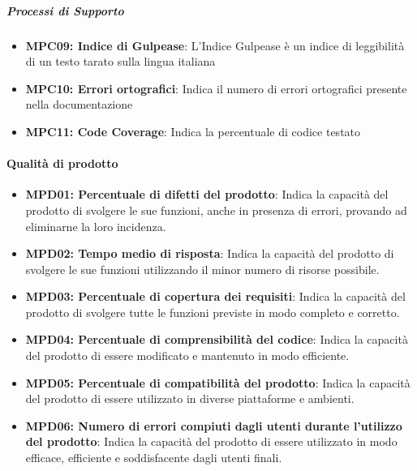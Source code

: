 \documentclass[12pt]{article}
\begin{document}
\subparagraph{Processi di Supporto}

\begin{itemize}
    \item \textbf{MPC09: Indice di Gulpease}: L'Indice Gulpease è un indice di leggibilità di un testo tarato sulla lingua italiana

    \item \textbf{MPC10: Errori ortografici}: Indica il numero di errori ortografici presente nella documentazione

    \item \textbf{MPC11: Code Coverage}: Indica la percentuale di codice testato

\end{itemize}
\paragraph{Qualità di prodotto}
\begin{itemize}
    \item \textbf{MPD01: Percentuale di difetti del prodotto}: Indica la capacità del prodotto di svolgere le sue funzioni, anche in presenza
          di errori, provando ad eliminarne la loro incidenza.

    \item \textbf{MPD02: Tempo medio di risposta}: Indica la capacità del prodotto di svolgere le sue funzioni utilizzando il minor
          numero di risorse possibile.

    \item \textbf{MPD03: Percentuale di copertura dei requisiti}: Indica la capacità del prodotto di svolgere tutte le funzioni previste in modo
          completo e corretto.

    \item \textbf{MPD04: Percentuale di comprensibilità del codice}: Indica la capacità del prodotto di essere modificato e mantenuto in modo
          efficiente.

    \item \textbf{MPD05: Percentuale di compatibilità del prodotto}: Indica la capacità del prodotto di essere utilizzato in diverse piattaforme e
          ambienti.

    \item \textbf{MPD06: Numero di errori compiuti dagli utenti durante l’utilizzo del
              prodotto}: Indica la capacità del prodotto di essere utilizzato in modo efficace, efficiente
          e soddisfacente dagli utenti finali.


\end{itemize}
\end{document}

